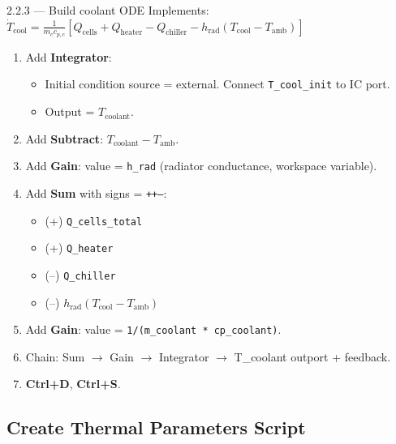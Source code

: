 \documentclass[11pt,a4paper]{article}
\begin{document}
\begin{guistep}{2.2.3 — Build coolant ODE}
Implements: $\dot{T}_\text{cool} = \frac{1}{m_c c_{p,c}} \left[ Q_\text{cells} + Q_\text{heater} - Q_\text{chiller} - h_\text{rad}(T_\text{cool} - T_\text{amb}) \right]$

\begin{enumerate}
    \item Add \textbf{Integrator}:
    \begin{itemize}
        \item Initial condition source = external. Connect \texttt{T\_cool\_init} to IC port.
        \item Output = $T_\text{coolant}$.
    \end{itemize}

    \item Add \textbf{Subtract}: $T_\text{coolant} - T_\text{amb}$.

    \item Add \textbf{Gain}: value = \texttt{h\_rad} (radiator conductance, workspace variable).

    \item Add \textbf{Sum} with signs = \texttt{++--}:
    \begin{itemize}
        \item (+) \texttt{Q\_cells\_total}
        \item (+) \texttt{Q\_heater}
        \item (--) \texttt{Q\_chiller}
        \item (--) $h_\text{rad}(T_\text{cool} - T_\text{amb})$
    \end{itemize}

    \item Add \textbf{Gain}: value = \texttt{1/(m\_coolant * cp\_coolant)}.

    \item Chain: Sum $\to$ Gain $\to$ Integrator $\to$ T\_coolant outport + feedback.

    \item \textbf{Ctrl+D}, \textbf{Ctrl+S}.
\end{enumerate}
\end{guistep}

\subsection{Create Thermal Parameters Script}
\end{document}
